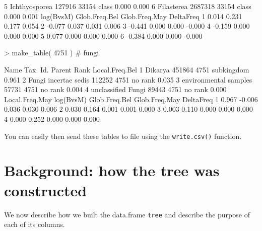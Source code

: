 \documentclass{article}
\begin{document}
\begin{Schunk}
\begin{Soutput}
5    Ichthyosporea   127916  33154   class          0.000          0.000
6       Filasterea  2687318  33154   class          0.000          0.001
  log(BvsM) Glob.Freq.Bel Glob.Freq.May DeltaFreq
1     0.014         0.231         0.177     0.054
2    -0.077         0.037         0.031     0.006
3    -0.441         0.000         0.000    -0.000
4    -0.159         0.000         0.000     0.000
5     0.077         0.000         0.000     0.000
6    -0.384         0.000         0.000    -0.000
\end{Soutput}
\begin{Sinput}
> make_table( 4751 ) # fungi
\end{Sinput}
\begin{Soutput}
                   Name Tax. Id. Parent       Rank Local.Freq.Bel
1               Dikarya   451864   4751 subkingdom          0.961
2  Fungi incertae sedis   112252   4751    no rank          0.035
3 environmental samples    57731   4751    no rank          0.004
4    unclassified Fungi    89443   4751    no rank          0.000
  Local.Freq.May log(BvsM) Glob.Freq.Bel Glob.Freq.May DeltaFreq
1          0.967    -0.006         0.036         0.030     0.006
2          0.030     0.164         0.001         0.001     0.000
3          0.003     0.110         0.000         0.000     0.000
4          0.000     0.252         0.000         0.000     0.000
\end{Soutput}
\end{Schunk}
You can easily then send these tables to file using the {\tt write.csv()} function.

\section{Background: how the tree was constructed}

We now describe how we built the data.frame {\tt tree} and describe the purpose of each of its columns.
\end{document}
